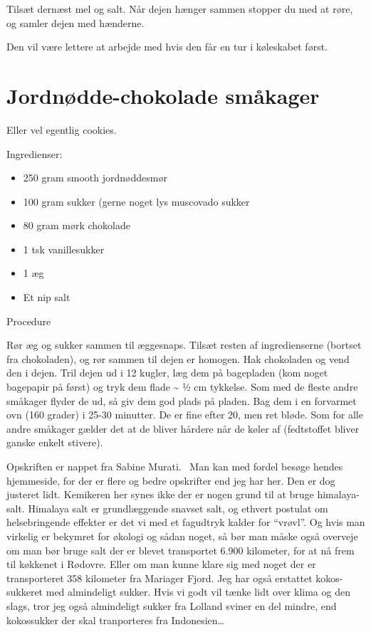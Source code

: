 \documentclass[
]{book}
\providecommand{\tightlist}{%
  \setlength{\itemsep}{0pt}\setlength{\parskip}{0pt}}
\begin{document}
Tilsæt dernæst mel og salt. Når dejen hænger sammen stopper du med at røre, og samler dejen med hænderne.

Den vil være lettere at arbejde med hvis den får en tur i køleskabet først.

\hypertarget{jordnuxf8dde-chokolade-smuxe5kager}{%
\section{Jordnødde-chokolade småkager}\label{jordnuxf8dde-chokolade-smuxe5kager}}

Eller vel egentlig cookies.

Ingredienser:

\begin{itemize}
\tightlist
\item
  250 gram smooth jordnøddesmør
\item
  100 gram sukker (gerne noget lys muscovado sukker
\item
  80 gram mørk chokolade
\item
  1 tsk vanillesukker
\item
  1 æg
\item
  Et nip salt
\end{itemize}

Procedure

Rør æg og sukker sammen til æggesnaps.
Tilsæt resten af ingredienserne (bortset fra chokoladen), og rør sammen til dejen er homogen.
Hak chokoladen og vend den i dejen.
Tril dejen ud i 12 kugler, læg dem på bagepladen (kom noget bagepapir på først) og tryk dem flade \textasciitilde{} ½ cm tykkelse.
Som med de fleste andre småkager flyder de ud, så giv dem god plads på pladen.
Bag dem i en forvarmet ovn (160 grader) i 25-30 minutter. De er fine efter 20, men ret bløde. Som for alle andre småkager gælder det at de bliver hårdere når de køler af (fedtstoffet bliver ganske enkelt stivere).

Opskriften er nappet fra Sabine Murati.~ Man kan med fordel besøge hendes hjemmeside, for der er flere og bedre opskrifter end jeg har her. Den er dog justeret lidt. Kemikeren her synes ikke der er nogen grund til at bruge himalaya-salt. Himalaya salt er grundlæggende snavset salt, og ethvert postulat om helsebringende effekter er det vi med et fagudtryk kalder for ``vrøvl''. Og hvis man virkelig er bekymret for økologi og sådan noget, så bør man måske også overveje om man bør bruge salt der er blevet transportet 6.900 kilometer, for at nå frem til køkkenet i Rødovre. Eller om man kunne klare sig med noget der er transporteret 358 kilometer fra Mariager Fjord. Jeg har også erstattet kokos-sukkeret med almindeligt sukker. Hvis vi godt vil tænke lidt over klima og den slags, tror jeg også almindeligt sukker fra Lolland sviner en del mindre, end kokossukker der skal tranporteres fra Indonesien\ldots{}
\end{document}
